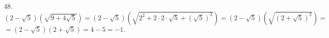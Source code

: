 48. $(2-\sqrt{5})(\sqrt{9+4\sqrt{5}})=(2-\sqrt{5})\left(\sqrt{2^2+2\cdot2\cdot\sqrt{5}+(\sqrt{5})^2}\right)=(2-\sqrt{5})\left(\sqrt{(2+\sqrt{5})^2}\right)=$\\$=
(2-\sqrt{5})(2+\sqrt{5})=4-5=-1.$\\
